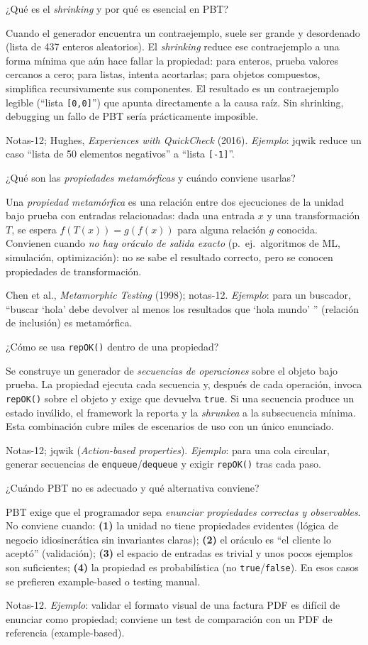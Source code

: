 \documentclass[11pt,a4paper]{article}
\newcounter{preg}
\newcommand{\qa}[3]{%
  \stepcounter{preg}%
  \vspace{0.4em}
  \begin{preguntabox}{\thepreg}
  #1
  \end{preguntabox}
  \begin{respuestabox}
  #2
  \end{respuestabox}
  \begin{refbox}
  #3
  \end{refbox}
  \vspace{0.6em}
}
\begin{document}
\qa{¿Qué es el \emph{shrinking} y por qué es esencial en PBT?}
{Cuando el generador encuentra un contraejemplo, suele ser grande y desordenado (lista de 437 enteros aleatorios). El \emph{shrinking} reduce ese contraejemplo a una forma mínima que aún hace fallar la propiedad: para enteros, prueba valores cercanos a cero; para listas, intenta acortarlas; para objetos compuestos, simplifica recursivamente sus componentes. El resultado es un contraejemplo legible (``lista \texttt{[0,0]}'') que apunta directamente a la causa raíz. Sin shrinking, debugging un fallo de PBT sería prácticamente imposible.}
{Notas-12; Hughes, \emph{Experiences with QuickCheck} (2016). \emph{Ejemplo}: jqwik reduce un caso ``lista de 50 elementos negativos'' a ``lista \texttt{[-1]}''.}

\qa{¿Qué son las \emph{propiedades metamórficas} y cuándo conviene usarlas?}
{Una \emph{propiedad metamórfica} es una relación entre dos ejecuciones de la unidad bajo prueba con entradas relacionadas: dada una entrada $x$ y una transformación $T$, se espera $f(T(x)) = g(f(x))$ para alguna relación $g$ conocida. Convienen cuando \emph{no hay oráculo de salida exacto} (p.~ej.\ algoritmos de ML, simulación, optimización): no se sabe el resultado correcto, pero se conocen propiedades de transformación.}
{Chen et al., \emph{Metamorphic Testing} (1998); notas-12. \emph{Ejemplo}: para un buscador, ``buscar `hola' debe devolver al menos los resultados que `hola mundo' '' (relación de inclusión) es metamórfica.}

\qa{¿Cómo se usa \texttt{repOK()} dentro de una propiedad?}
{Se construye un generador de \emph{secuencias de operaciones} sobre el objeto bajo prueba. La propiedad ejecuta cada secuencia y, después de cada operación, invoca \texttt{repOK()} sobre el objeto y exige que devuelva \texttt{true}. Si una secuencia produce un estado inválido, el framework la reporta y la \emph{shrunkea} a la subsecuencia mínima. Esta combinación cubre miles de escenarios de uso con un único enunciado.}
{Notas-12; jqwik (\emph{Action-based properties}). \emph{Ejemplo}: para una cola circular, generar secuencias de \texttt{enqueue}/\texttt{dequeue} y exigir \texttt{repOK()} tras cada paso.}

\qa{¿Cuándo PBT no es adecuado y qué alternativa conviene?}
{PBT exige que el programador sepa \emph{enunciar propiedades correctas y observables}. No conviene cuando: \textbf{(1)} la unidad no tiene propiedades evidentes (lógica de negocio idiosincrática sin invariantes claras); \textbf{(2)} el oráculo es ``el cliente lo aceptó'' (validación); \textbf{(3)} el espacio de entradas es trivial y unos pocos ejemplos son suficientes; \textbf{(4)} la propiedad es probabilística (no \texttt{true}/\texttt{false}). En esos casos se prefieren example-based o testing manual.}
{Notas-12. \emph{Ejemplo}: validar el formato visual de una factura PDF es difícil de enunciar como propiedad; conviene un test de comparación con un PDF de referencia (example-based).}
\end{document}
